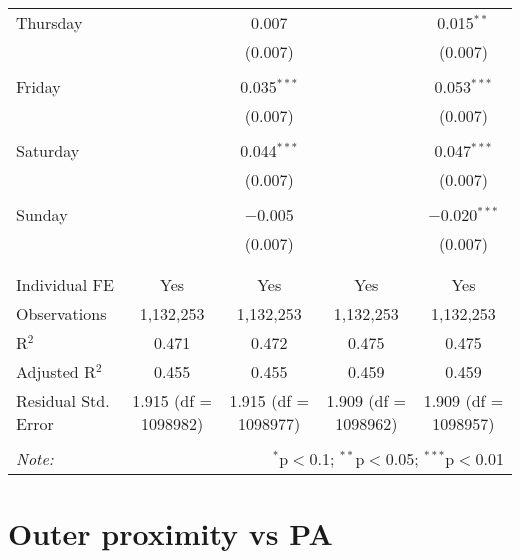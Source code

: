 \documentclass[
]{article}
\begin{document}
\begin{table}[!htbp]
{\begin{tabular}{@{\extracolsep{5pt}}lcccc}
 Thursday &  & 0.007 &  & 0.015$^{**}$ \\ 
  &  & (0.007) &  & (0.007) \\ 
  & & & & \\ 
 Friday &  & 0.035$^{***}$ &  & 0.053$^{***}$ \\ 
  &  & (0.007) &  & (0.007) \\ 
  & & & & \\ 
 Saturday &  & 0.044$^{***}$ &  & 0.047$^{***}$ \\ 
  &  & (0.007) &  & (0.007) \\ 
  & & & & \\ 
 Sunday &  & $-$0.005 &  & $-$0.020$^{***}$ \\ 
  &  & (0.007) &  & (0.007) \\ 
  & & & & \\ 
\hline \\[-1.8ex] 
Individual FE & Yes & Yes & Yes & Yes \\ 
Observations & 1,132,253 & 1,132,253 & 1,132,253 & 1,132,253 \\ 
R$^{2}$ & 0.471 & 0.472 & 0.475 & 0.475 \\ 
Adjusted R$^{2}$ & 0.455 & 0.455 & 0.459 & 0.459 \\ 
Residual Std. Error & 1.915 (df = 1098982) & 1.915 (df = 1098977) & 1.909 (df = 1098962) & 1.909 (df = 1098957) \\ 
\hline 
\hline \\[-1.8ex] 
\textit{Note:}  & \multicolumn{4}{r}{$^{*}$p$<$0.1; $^{**}$p$<$0.05; $^{***}$p$<$0.01} \\ 
\end{tabular}
} 
\end{table} 
\newpage
\section{Outer proximity vs PA}
\end{document}
